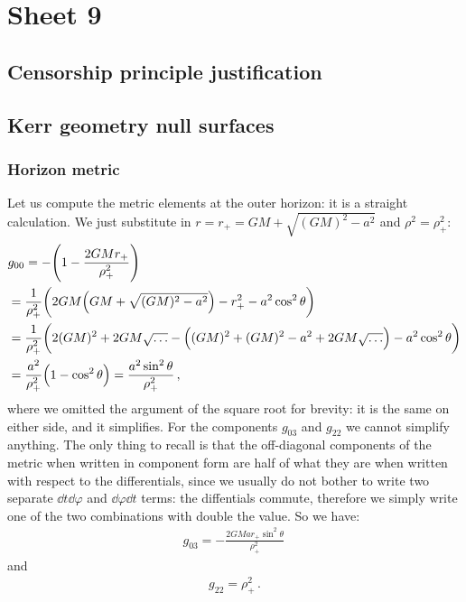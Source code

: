 \documentclass[main.tex]{subfiles}
\begin{document}
\section{Sheet 9}

\subsection{Censorship principle justification}

\subsection{Kerr geometry null surfaces}

\subsubsection{Horizon metric}

Let us compute the metric elements at the outer horizon: it is a straight calculation. We just substitute in \(r = r_{+} = GM + \sqrt{(GM)^2 - a^2}\) and \(\rho^2 = \rho^2_{+}\): 
%
\begin{subequations}
\begin{align}
  &g_{00}  = - \qty(1 - \frac{2GMr_{+}}{\rho_{+}^2})  \\
  &= \frac{1}{\rho_{+}^2} \qty(2GM \qty(GM + \sqrt{(GM)^2 - a^2}) - r_{+}^2 - a^2 \cos^2\theta )  \\
  &= \frac{1}{\rho_{+}^2} \qty( 2 (GM)^2 + 2GM \sqrt{\dots}- \qty((GM)^2 + (GM)^2 -a^2 + 2GM \sqrt{\dots}) - a^2 \cos^2 \theta )  \\
  &= \frac{a^2}{\rho_{+}^2}  \qty(1 - \cos^2 \theta ) = \frac{a^2 \sin^2\theta}{\rho_{+}^2}
\,,
\end{align}
\end{subequations}
%
where we omitted the argument of the square root for brevity: it is the same on either side, and it simplifies. 
For the components \(g_{03}\) and \(g_{22} \) we cannot simplify anything. The  only thing to recall is that the off-diagonal components of the metric when written in component form are half of what they are when written with respect to the differentials, since we usually do not bother to write two separate \(\dd{t} \dd{\varphi }\) and \(\dd{\varphi } \dd{t}\) terms: the diffentials commute, therefore we simply write one of the two combinations with double the value. So we have: 
%
\begin{align}
  g_{03} = -\frac{2GMa r_+ \sin^2\theta }{\rho_{+}^2}
\,
\end{align}
and 
%
\begin{align}
  g_{22} = \rho_{+}^2
\,.
\end{align}
\end{document}
